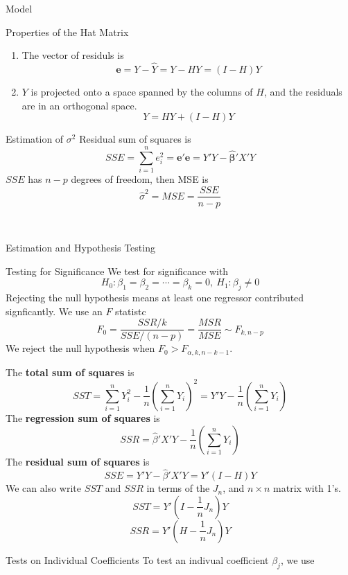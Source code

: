 \documentclass{article}
\begin{document}
\begin{multicols*}{3}
\begin{blackbox}{Model}
\begin{bluebox}{Properties of the Hat Matrix}
\begin{enumerate}[label=(\alph*)]
                Moreover, $(I-H)$ is idempotent and a project matrix as well.
                \item The vector of residuls is \\[-2ex]
                \[\boldsymbol{e} = Y - \hat{Y} = Y - HY = (I-H)Y\]
                \item $Y$ is projected onto a space spanned by the columns of $H$, and the residuals are in an orthogonal space.\\[-2ex]
                \[Y = HY + (I-H)Y\]
            \end{enumerate}
        \end{bluebox}
        \begin{redbox}{Estimation of $\sigma^2$}
            Residual sum of squares is \\[-2ex]
            \[SSE = \sum_{i=1}^n e_i^2 = \boldsymbol{e'e} = Y'Y - \boldsymbol{\hat{\beta}}'X'Y\]
            $SSE$ has $n-p$ degrees of freedom, then MSE is 
            \[\hat{\sigma}^2 = MSE = \frac{SSE}{n-p}\]
        \end{redbox}\\[-2ex]
    \end{blackbox}
    \begin{blackbox}{Estimation and Hypothesis Testing}
        \begin{brownbox}{Testing for Significance}
            We test for significance with 
            \[H_0: \beta_1 = \beta_2 = \cdots = \beta_k = 0, \ H_1: \beta_j \neq 0\]
            Rejecting the null hypothesis means at least one regressor contributed signficantly. We use an $F$ statistc 
            \[F_0 = \frac{SSR/k}{SSE/(n-p)} = \frac{MSR}{MSE} \sim F_{k, n-p}\]
            We reject the null hypothesis when $F_0 > F_{\alpha, k,n-k-1}$.
        \end{brownbox}
        The \textbf{total sum of squares} is 
        \[SST = \sum_{i=1}^n Y_i^2 -  \frac{1}{n}\left(\sum_{i=1}^n Y_i\right)^2 = Y'Y - \frac{1}{n}\left(\sum_{i=1}^n Y_i\right)\]
        The \textbf{regression sum of squares} is 
        \[SSR = \hat{\beta}'X'Y -\frac{1}{n}\left(\sum_{i=1}^n Y_i\right)\]
        The \textbf{residual sum of squares} is 
        \[SSE = Y'Y - \hat{\beta}'X'Y = Y'(I - H)Y\]
        We can also write $SST$ and $SSR$ in terms of the $J_n$, and $n\times n$ matrix with 1's.
        \[SST = Y' \left(I - \frac{1}{n}J_n\right)Y\]
        \[SSR = Y'\left(H - \frac{1}{n}J_n\right)Y\]
        \begin{bluebox}{Tests on Individual Coefficients}
            To test an indivual coefficient $\beta_j$, we use

\end{bluebox}
\end{blackbox}
\end{multicols*}
\end{document}
